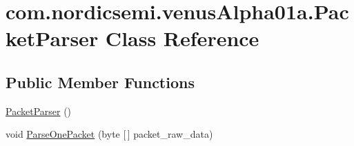 \hypertarget{classcom_1_1nordicsemi_1_1venus_alpha01a_1_1_packet_parser}{}\section{com.\+nordicsemi.\+venus\+Alpha01a.\+Packet\+Parser Class Reference}
\label{classcom_1_1nordicsemi_1_1venus_alpha01a_1_1_packet_parser}
\subsection*{Public Member Functions}
\begin{DoxyCompactItemize}
\item 
\hyperlink{classcom_1_1nordicsemi_1_1venus_alpha01a_1_1_packet_parser_a7015e53211f8c9c9e167a844ad65337d}{Packet\+Parser} ()
\item 
void \hyperlink{classcom_1_1nordicsemi_1_1venus_alpha01a_1_1_packet_parser_a88761746954d9733178f0dd1039323ed}{Parse\+One\+Packet} (byte \mbox{[}$\,$\mbox{]} packet\+\_\+raw\+\_\+data)
\end{DoxyCompactItemize}
